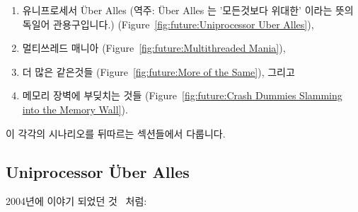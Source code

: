 \begin{enumerate}
\item	유니프로세서 \"Uber Alles (역주: \"Uber Alles 는 '모든것보다
	위대한' 이라는 뜻의 독일어 관용구입니다.)
	(Figure~\ref{fig:future:Uniprocessor Uber Alles}),
\item	멀티쓰레드 매니아
	(Figure~\ref{fig:future:Multithreaded Mania}),
\item	더 많은 같은것들
	(Figure~\ref{fig:future:More of the Same}), 그리고
\item	메모리 장벽에 부딪치는 것들
	(Figure~\ref{fig:future:Crash Dummies Slamming into the Memory Wall}).

\end{enumerate}

이 각각의 시나리오를 뒤따르는 섹션들에서 다룹니다.

\subsection{Uniprocessor \"Uber Alles}
\label{sec:future:Uniprocessor Uber Alles}

2004년에 이야기 되었던 것~\cite{PaulEdwardMcKenneyPhD} 처럼:

